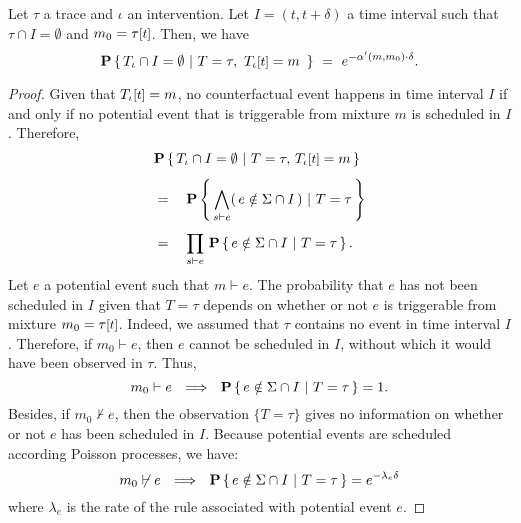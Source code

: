 \begin{theorem*}
  Let $\tau$ a trace and $\iota$ an intervention. Let
  $I = (t, t+\delta)$ a time interval such that
  $\tau \cap I = \emptyset$ and $m_0 = \TSTATE{t}{\tau}$. Then, we
  have
  \[\CProb{ \ATRAJ{} \cap I = \emptyset }{ T=\tau,\
      \TSTATE{t}{\ATRAJ{}} = m\ }
    \ =\ e^{-\alpha'(m, m_0) \cdot \delta}.
  \]
\end{theorem*}
\begin{proof}

  Given that $\TSTATE{t}{\ATRAJ{}} = m$, no counterfactual event
  happens in time interval $I$ if and only if no potential event that
  is triggerable from mixture $m$ is scheduled in $I$. Therefore,
  \vskip 0.0cm
  \begin{equation}\label{eqn:scheduled-decomposition}
    \begin{aligned}
      &\CProb{ \ATRAJ{} \cap I = \emptyset } { T=\tau,\,
        \TSTATE{t}{\ATRAJ{}} = m }
      \\[0.4em]
      &= \quad \CProb{ \bigwedge_{s \vdash e} (\,e \notin \Sigma \cap
        I \,) }{ T=\tau }
      \\[0.4em]
      &= \quad \prod_{s \vdash e}\, \CProb{e \notin \Sigma \cap I }{
        T=\tau }.
    \end{aligned}
  \end{equation}
  \vskip 0.2cm Let $e$ a potential event such that $m \vdash e$. The
  probability that $e$ has not been scheduled in $I$ given that
  $T=\tau$ depends on whether or not $e$ is triggerable from mixture
  $m_0 = \TSTATE{t}{\tau}$. Indeed, we assumed that $\tau$ contains no
  event in time interval $I$. Therefore, if $m_0 \vdash e$, then $e$
  cannot be scheduled in $I$, without which it would have been
  observed in $\tau$.  Thus,
  \begin{equation}\label{eqn:pscheduled1}
    m_0 \vdash e \ \ \Longrightarrow\ \ \mathbf{P} \left\{\, e \notin \Sigma \cap I \ |\ T=\tau  \,\right\} = 1.
  \end{equation}
  Besides, if $m_0 \not\vdash e$, then the observation $\{ T=\tau \}$
  gives no information on whether or not $e$ has been scheduled in
  $I$. Because potential events are scheduled according Poisson
  processes, we have:
  \begin{equation}\label{eqn:pscheduled2}
    m_0 \not\vdash e \ \ \Longrightarrow\ \ \mathbf{P} \left\{\, e \notin \Sigma \cap I \ |\ 
      T=\tau  \,\right\} = e^{-\lambda_e \delta}
  \end{equation} where $\lambda_e$ is the rate of the rule associated with potential event $e$.

\end{proof}
